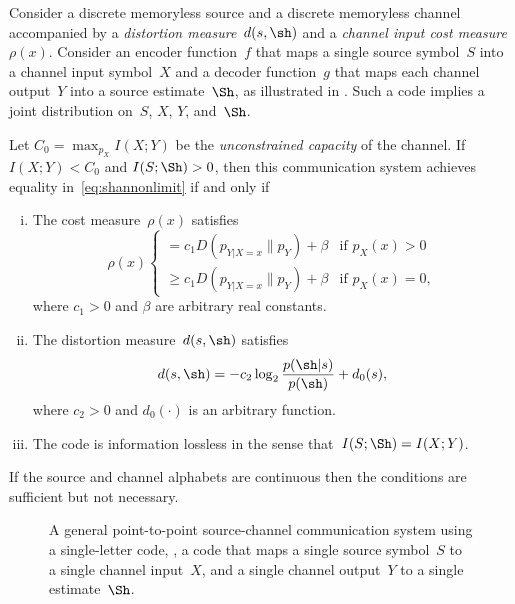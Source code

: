 \begin{theorem}
  \label{thm:tcntcbwmatch}
  Consider a discrete memoryless source and a discrete memoryless channel
  accompanied by a \emph{distortion measure}~$d(s,\sh)$ and a \emph{channel
  input cost measure} $\rho(x)$. Consider an encoder function~$f$ that maps a
  single source symbol~$S$ into a channel input symbol~$X$ and a decoder
  function~$g$ that maps each channel output~$Y$ into a source estimate~$\Sh$,
  as illustrated in .  Such a code implies a joint
  distribution on~$S$, $X$, $Y$, and~$\Sh$.

  Let $C_0 = \max_{p_X} I(X;Y)$ be the \emph{unconstrained capacity} of the
  channel.  If $I(X;Y) < C_0$ and $I(S;\Sh) > 0$, then this communication system
  achieves equality in~\eqref{eq:shannonlimit} if and only if
  \begin{enumerate}[(i)]
    \item The cost measure~$\rho(x)$ satisfies
      \begin{equation}
        \label{eq:optcost}
        \rho(x)
        \begin{cases}
          = c_1 D(p_{Y|X=x} \| p_Y) + \beta & \text{if $p_X(x) > 0$} \\
          \ge c_1 D(p_{Y|X=x} \| p_Y) + \beta & \text{if $p_X(x) = 0$},
        \end{cases}
      \end{equation}
      where $c_1 > 0$ and $\beta$ are arbitrary real constants.

    \item The distortion measure~$d(s,\sh)$ satisfies
      \begin{equation}
        \label{eq:optdist}
        d(s,\sh) = - c_2 \log_2 \frac{p(\sh|s)}{p(\sh)} + d_0(s),
      \end{equation}
      where $c_2 > 0$ and $d_0(\cdot)$ is an arbitrary function.

    \item The code is information lossless in the sense that~$I(S;\Sh) =
      I(X;Y)$.
  \end{enumerate}
  If the source and channel alphabets are continuous then the conditions are
  sufficient but not necessary.
\end{theorem}

\begin{figure}
  \begin{center}
    
  \end{center}
  \caption{A general point-to-point source-channel communication system using a
  single-letter code, \ie, a code that maps a single source symbol~$S$ to a
  single channel input~$X$, and a single channel output~$Y$ to a single
  estimate~$\Sh$.}
  \label{fig:scgensingle}
\end{figure}

